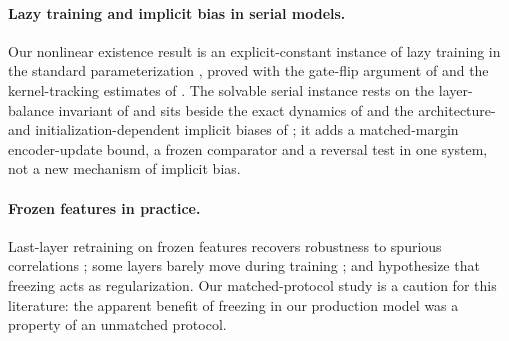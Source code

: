 \paragraph{Lazy training and implicit bias in serial models.}
Our nonlinear existence result is an explicit-constant instance of lazy
training in the standard parameterization
\citep{chizat2019lazy,astra_sohldickstein2020,yang2021tensor}, proved with
the gate-flip argument of \citet{astra_du2019} and the kernel-tracking
estimates of \citet{astra_lee2019,astra_arora2019}. The solvable serial
instance rests on the layer-balance invariant of \citet{astra_du2018balance}
and sits beside the exact dynamics of \citet{astra_saxe2014} and the
architecture- and initialization-dependent implicit biases of
\citet{astra_yun2021,astra_moroshko2020,astra_berthier2023}; it adds a
matched-margin encoder-update bound, a frozen comparator and a reversal test
in one system, not a new mechanism of implicit bias.

\paragraph{Frozen features in practice.}
Last-layer retraining on frozen features recovers robustness to spurious
correlations \citep{kirichenko2023dfr}; some layers barely move during
training \citep{zhang2022layers}; and \citet{coil2025freezing} hypothesize
that freezing acts as regularization. Our matched-protocol study is a
caution for this literature: the apparent benefit of freezing in our
production model was a property of an unmatched protocol.
